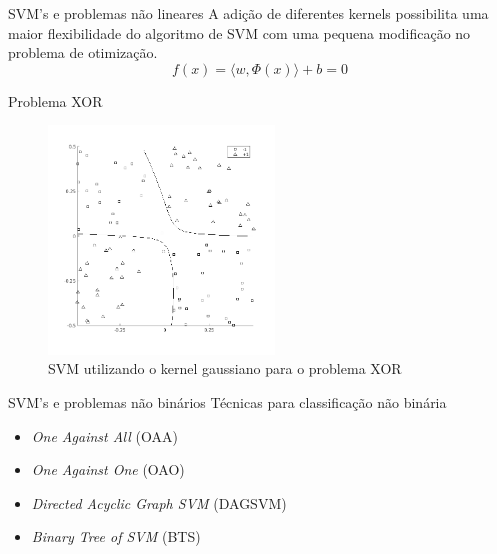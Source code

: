 \documentclass[10pt]{beamer}
\begin{document}

\begin{frame} {SVM's e problemas não lineares}
  A adição de diferentes kernels possibilita uma maior flexibilidade do algoritmo de
  SVM com uma pequena modificação no problema de otimização.
  \begin{equation}
    f(x) = \langle w, \Phi(x) \rangle + b = 0
    \nonumber
  \end{equation}
\end{frame}

\begin{frame}{Problema XOR}
  \begin{figure}
    \centering
    \includegraphics[width=6cm]{images/svmXor.png}
    \caption{SVM utilizando o kernel gaussiano para o problema XOR}
  \end{figure}
\end{frame}

\begin{frame}{SVM's e problemas não binários}
  Técnicas para classificação não binária
  \begin{itemize}
    \item \textit{One Against All} (OAA)
    \item \textit{One Against One} (OAO)
    \item \textit{Directed Acyclic Graph SVM} (DAGSVM)
    \item \textit{Binary Tree of SVM} (BTS)
  \end{itemize}

\end{frame}
\end{document}
